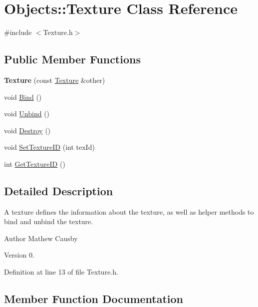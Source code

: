 \hypertarget{class_objects_1_1_texture}{}\section{Objects\+:\+:Texture Class Reference}
\label{class_objects_1_1_texture}


{\ttfamily \#include $<$Texture.\+h$>$}

\subsection*{Public Member Functions}
\begin{DoxyCompactItemize}
\item 
\mbox{\label{class_objects_1_1_texture_a8227f3e1a2240abafaeec2a911adfbff}} 
{\bfseries Texture} (const \hyperlink{class_objects_1_1_texture}{Texture} \&other)
\item 
void \hyperlink{class_objects_1_1_texture_a1964a04cbe93f6040f19238f51c98616}{Bind} ()
\item 
void \hyperlink{class_objects_1_1_texture_aecfe36e814417cf874c1145f28320f7f}{Unbind} ()
\item 
void \hyperlink{class_objects_1_1_texture_a50e08a5bbec2568ac45ba2d49d3c1dbd}{Destroy} ()
\item 
void \hyperlink{class_objects_1_1_texture_ab64d6c23647133c9bd86ca9a457bae77}{Set\+Texture\+ID} (int tex\+Id)
\item 
int \hyperlink{class_objects_1_1_texture_a6d1a2e5398eab5d19ef717638305f9c4}{Get\+Texture\+ID} ()
\end{DoxyCompactItemize}


\subsection{Detailed Description}
A texture defines the information about the texture, as well as helper methods to bind and unbind the texture. \begin{DoxyAuthor}{Author}
Mathew Causby 
\end{DoxyAuthor}
\begin{DoxyVersion}{Version}
0. 
\end{DoxyVersion}


Definition at line 13 of file Texture.\+h.



\subsection{Member Function Documentation}
\mbox{\label{class_objects_1_1_texture_a1964a04cbe93f6040f19238f51c98616}} 
